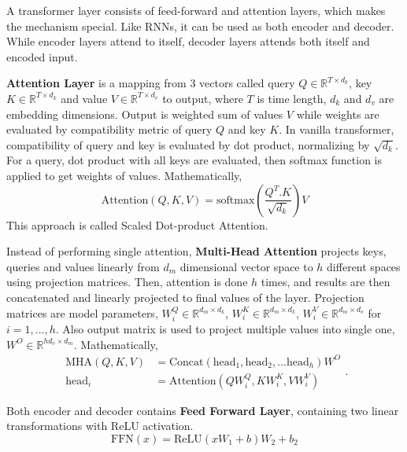 A transformer layer consists of feed-forward and attention layers, which makes the mechanism special. 
Like RNNs, it can be used as both encoder and decoder. 
While encoder layers attend to itself, decoder layers attends both itself and encoded input. 

\textbf{Attention Layer} is a mapping from 3 vectors called query $Q \in \mathbb{R}^{T \times d_k}$, key $K \in \mathbb{R}^{T \times d_k}$ and value $V \in \mathbb{R}^{T \times d_v}$ to output, 
where $T$ is time length, $d_k$ and $d_v$ are embedding dimensions. 
Output is weighted sum of values $V$ while weights are evaluated by compatibility metric of query $Q$ and key $K$. 
In vanilla transformer, compatibility of query and key is evaluated by dot product, normalizing by $\sqrt{d_k}$. 
For a query, dot product with all keys are evaluated, then softmax function is applied to get weights of values. Mathematically, 
\begin{equation}
\mathrm{Attention}(Q, K, V) = \mathrm{softmax}(\frac{Q^{T}. K}{\sqrt{d_k}}) V
\end{equation}
This approach is called Scaled Dot-product Attention. 

Instead of performing single attention, \textbf{Multi-Head Attention} projects keys, queries and values linearly from $d_m$ dimensional vector space to $h$ different spaces using projection matrices. 
Then, attention is done $h$ times, and results are then concatenated and linearly projected to final values of the layer.
Projection matrices are model parameters, $W^Q_i \in \mathbb{R}^{d_m \times d_k}$, $W^K_i \in \mathbb{R}^{d_m \times d_k}$, $W^V_i \in \mathbb{R}^{d_m \times d_v}$ for $i=1,...,h$. 
Also output matrix is used to project multiple values into single one, $W^O \in \mathbb{R}^{h d_v \times d_m}$. Mathematically, 
\begin{equation}
\begin{split}
\mathrm{MHA}(Q,K,V) &=  \text{Concat}(\mathrm{head}_1, \mathrm{head}_2, ... \mathrm{head}_h)W^O \\
\mathrm{head}_i &=  \text{Attention}(QW^Q_i,KW^K_i,VW^V_i)
\end{split}.
\end{equation}

Both encoder and decoder contains \textbf{Feed Forward Layer}, containing two linear transformations with ReLU activation.
\begin{equation}
\mathrm{FFN}(x) = \text{ReLU}(xW_1+b)W_2+b_2
\end{equation}


